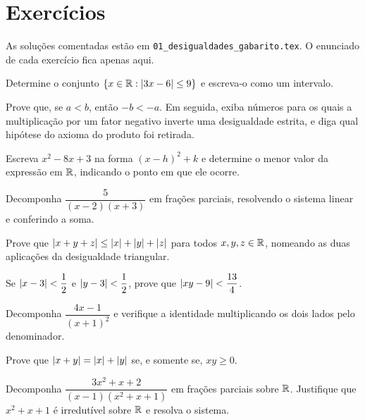 \documentclass[11pt,a4paper]{article}
\begin{document}
\section{Exercícios}

As soluções comentadas estão em \texttt{01\_desigualdades\_gabarito.tex}. O enunciado de cada exercício fica apenas aqui.

\begin{exercicio}
Determine o conjunto $\{x\in\mathbb{R}:\left\lvert 3x-6 \right\rvert\le 9\}$ e escreva-o como um intervalo.
\end{exercicio}

\begin{exercicio}
Prove que, se $a<b$, então $-b<-a$. Em seguida, exiba números para os quais a multiplicação por um fator negativo inverte uma desigualdade estrita, e diga qual hipótese do axioma do produto foi retirada.
\end{exercicio}

\begin{exercicio}
Escreva $x^2-8x+3$ na forma $(x-h)^2+k$ e determine o menor valor da expressão em $\mathbb{R}$, indicando o ponto em que ele ocorre.
\end{exercicio}

\begin{exercicio}
Decomponha $\dfrac{5}{(x-2)(x+3)}$ em frações parciais, resolvendo o sistema linear e conferindo a soma.
\end{exercicio}

\begin{exercicio}
Prove que $\left\lvert x+y+z \right\rvert\le\left\lvert x \right\rvert+\left\lvert y \right\rvert+\left\lvert z \right\rvert$ para todos $x,y,z\in\mathbb{R}$, nomeando as duas aplicações da desigualdade triangular.
\end{exercicio}

\begin{exercicio}
Se $\left\lvert x-3 \right\rvert<\dfrac{1}{2}$ e $\left\lvert y-3 \right\rvert<\dfrac{1}{2}$, prove que $\left\lvert xy-9 \right\rvert<\dfrac{13}{4}$.
\end{exercicio}

\begin{exercicio}
Decomponha $\dfrac{4x-1}{(x+1)^2}$ e verifique a identidade multiplicando os dois lados pelo denominador.
\end{exercicio}

\begin{exercicio}
Prove que $\left\lvert x+y \right\rvert=\left\lvert x \right\rvert+\left\lvert y \right\rvert$ se, e somente se, $xy\ge 0$.
\end{exercicio}

\begin{exercicio}
Decomponha $\dfrac{3x^2+x+2}{(x-1)(x^2+x+1)}$ em frações parciais sobre $\mathbb{R}$. Justifique que $x^2+x+1$ é irredutível sobre $\mathbb{R}$ e resolva o sistema.
\end{exercicio}
\end{document}
